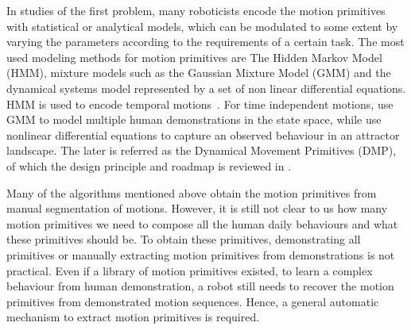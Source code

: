 In studies of the first problem, many roboticists encode the motion primitives with statistical or analytical models, which can be modulated to some extent by varying the parameters according to the requirements of a certain task. The most used modeling methods for motion primitives are The Hidden Markov Model (HMM), mixture models such as the Gaussian Mixture Model (GMM) and the dynamical systems model represented by a set of non linear differential equations. HMM is used to encode temporal motions~\citep{inamura2004embodied,kulic2008incremental,takano2008integrating,lee2010incremental,bidan2013robio}. For time independent motions, \citet{gribovskaya2010learning,khansari2010imitation} use GMM to model multiple human demonstrations in the state space, while \citet{ijspeert2002movement,Ijspeert2003attractor,schaal2005learning,peters2008reinforcement} use nonlinear differential equations to capture an observed behaviour in an attractor landscape. The later is referred as the Dynamical Movement Primitives (DMP), of which the design principle and roadmap is reviewed in \citep{ijspeert2013dynamical}.

Many of the algorithms mentioned above obtain the motion primitives from manual segmentation of motions. However, it is still not clear to us how many motion primitives we need to compose all the human daily behaviours and what these primitives should be. To obtain these primitives, demonstrating all primitives or manually extracting motion primitives from demonstrations is not practical. Even if a library of motion primitives existed, to learn a complex behaviour from human demonstration, a robot still needs to recover the motion primitives from demonstrated motion sequences. Hence, a general automatic mechanism to extract motion primitives is required.

